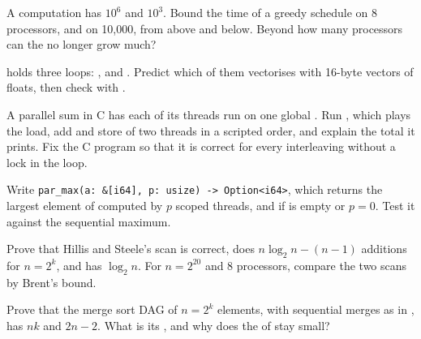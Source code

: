\begin{exercise}[$\star$]\label{exo:b3:parallel-programming:3}
A computation has  $10^6$ and  $10^3$. Bound the time of a greedy schedule on 8 processors, and on 10,000, from above and below. Beyond how many processors can the  no longer grow much?
\end{exercise}

\begin{exercise}[$\star$]\label{exo:b3:parallel-programming:4}
 holds three loops: ,  and . Predict which of them  vectorises with 16-byte vectors of floats, then check with .
\end{exercise}

\begin{exercise}[$\star\star$]\label{exo:b3:parallel-programming:5}
A parallel sum in C has each of its threads run  on one global . Run , which plays the load, add and store of two threads in a scripted order, and explain the total it prints. Fix the C program so that it is correct for every interleaving without a lock in the loop.
\end{exercise}

\begin{exercise}[$\star\star$]\label{exo:b3:parallel-programming:6}
Write \texttt{par\_max(a:\ \&[i64], p:\ usize) -> Option<i64>}, which returns the largest element of  computed by $p$ scoped threads, and  if  is empty or $p = 0$. Test it against the sequential maximum.
\end{exercise}

\begin{exercise}[$\star\star$]\label{exo:b3:parallel-programming:7}
Prove that Hillis and Steele's scan is correct, does $n \log_2 n - (n - 1)$ additions for $n = 2^k$, and has  $\log_2 n$. For $n = 2^{20}$ and 8 processors, compare the two scans by Brent's bound.
\end{exercise}

\begin{exercise}[$\star\star$]\label{exo:b3:parallel-programming:8}
Prove that the merge sort DAG of $n = 2^k$ elements, with sequential merges as in , has  $nk$ and  $2n - 2$. What is its , and why does the  of  stay small?
\end{exercise}

